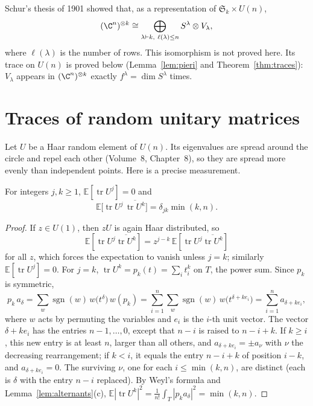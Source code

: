 \begin{remark}
Schur's thesis of 1901 showed that, as a representation of $\mathfrak S_k\times U(n)$,
\[
(\C^n)^{\otimes k}\cong\bigoplus_{\lambda\vdash k,\ \ell(\lambda)\le n}S^\lambda\otimes V_\lambda,
\]
where $\ell(\lambda)$ is the number of rows. This isomorphism is not proved here. Its trace on $U(n)$ is proved below (Lemma~\ref{lem:pieri} and Theorem~\ref{thm:traces}): $V_\lambda$ appears in $(\C^n)^{\otimes k}$ exactly $f^\lambda=\dim S^\lambda$ times.
\end{remark}

\section{Traces of random unitary matrices}

Let $U$ be a Haar random element of $U(n)$. Its eigenvalues are spread around the circle and repel each other (Volume~8, Chapter~8), so they are spread more evenly than independent points. Here is a precise measurement.

\begin{proposition}\label{prop:powertraces}
For integers $j,k\ge1$, $\mathbb E[\operatorname{tr}U^j]=0$ and
\[
\mathbb E\bigl[\operatorname{tr}U^j\,\overline{\operatorname{tr}U^k}\bigr]=\delta_{jk}\min(k,n).
\]
\end{proposition}

\begin{proof}
If $z\in U(1)$, then $zU$ is again Haar distributed, so
\[
\mathbb E[\operatorname{tr}U^j\overline{\operatorname{tr}U^k}]=z^{j-k}\,\mathbb E[\operatorname{tr}U^j\overline{\operatorname{tr}U^k}]
\]
 for all $z$, which forces the expectation to vanish unless $j=k$; similarly $\mathbb E[\operatorname{tr}U^j]=0$.
For $j=k$, $\operatorname{tr}U^k=p_k(t)=\sum_it_i^k$ on $T$, the power sum. Since $p_k$ is symmetric,
\[
p_k\,a_\delta=\sum_{w}\operatorname{sgn}(w)\,w\bigl(t^\delta\bigr)\,w(p_k)=\sum_{i=1}^n\sum_w\operatorname{sgn}(w)\,w\bigl(t^{\delta+ke_i}\bigr)=\sum_{i=1}^na_{\delta+ke_i},
\]
where $w$ acts by permuting the variables and $e_i$ is the $i$-th unit vector. The vector $\delta+ke_i$ has the entries $n-1,\dots,0$, except that $n-i$ is raised to $n-i+k$. If $k\ge i$, this new entry is at least $n$, larger than all others, and
$a_{\delta+ke_i}=\pm a_\nu$ with $\nu$ the decreasing rearrangement; if $k<i$, it equals the entry $n-i+k$ of position $i-k$, and $a_{\delta+ke_i}=0$. The surviving $\nu$, one for each $i\le\min(k,n)$, are distinct (each is $\delta$ with the entry $n-i$ replaced). By
Weyl's formula and Lemma~\ref{lem:alternants}(c), $\mathbb E|\operatorname{tr}U^k|^2=\frac1{n!}\int_T|p_ka_\delta|^2=\min(k,n)$.
\end{proof}

